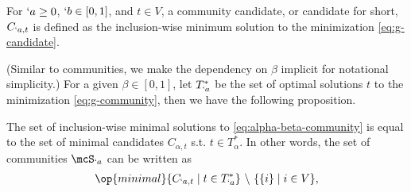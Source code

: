 \begin{definition}
	\label{def:candidates}
	For $`a \geq 0$, $`b\in [0,1]$, and $t\in V$, a community candidate, or
	candidate for short, $C_{`a,t}$ is defined as the inclusion-wise minimum solution to the minimization
	\eqref{eq:g-candidate}.
\end{definition}
(Similar to communities, we make the dependency on $\beta$ implicit for notational simplicity.)
For a given $\beta \in [0,1]$, let $T^*_{`a}$ be the set of optimal solutions $t$ to the
minimization \eqref{eq:g-community}, then we have the following proposition.
\begin{proposition}
	\label{prop:communities-from-candidates}
	The set of inclusion-wise minimal solutions to \eqref{eq:alpha-beta-community} is equal to the
	set of minimal candidates $C_{\alpha, t}$ s.t. $t\in T^{*}_{\alpha}$.
	In other words, the set of communities $\mcS_{`a}$ can be written as 
	\begin{align}
		\op{minimal} \{C_{`a, t} \mid t\in T^*_{`a}\} \ \backslash \ \{\Set{i} \mid i \in V\}, \label{eq:abt->ab}
	\end{align}
\end{proposition}
    
